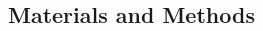 \documentclass[a0,portrait]{a0poster}
\begin{document}
\begin{multicols}{2}


\section*{Materials and Methods}


\end{multicols}
\end{document}
